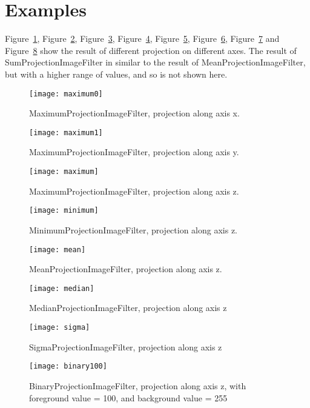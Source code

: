 \documentclass{InsightArticle}
\begin{document}
\section{Examples}
Figure~\ref{maximum0}, Figure~\ref{maximum1}, Figure~\ref{maximum},
Figure~\ref{minimum}, Figure~\ref{mean}, Figure~\ref{median},
Figure~\ref{sigma} and Figure~\ref{binary100} show the result
of different projection on different axes. The result of
SumProjectionImageFilter in similar to the result of MeanProjectionImageFilter,
but with a higher range of values, and so is not shown here.

\begin{figure}[htbp]
\centering
\texttt{[image: maximum0]}
\caption{MaximumProjectionImageFilter, projection along axis x.\label{maximum0}}
\end{figure}

\begin{figure}[htbp]
\centering
\texttt{[image: maximum1]}
\caption{MaximumProjectionImageFilter, projection along axis y.\label{maximum1}}
\end{figure}

\begin{figure}[htbp]
\centering
\texttt{[image: maximum]}
\caption{MaximumProjectionImageFilter, projection along axis z.\label{maximum}}
\end{figure}

\begin{figure}[htbp]
\centering
\texttt{[image: minimum]}
\caption{MinimumProjectionImageFilter, projection along axis z.\label{minimum}}
\end{figure}

\begin{figure}[htbp]
\centering
\texttt{[image: mean]}
\caption{MeanProjectionImageFilter, projection along axis z.\label{mean}}
\end{figure}

\begin{figure}[htbp]
\centering
\texttt{[image: median]}
\caption{MedianProjectionImageFilter, projection along axis z\label{median}}
\end{figure}

\begin{figure}[htbp]
\centering
\texttt{[image: sigma]}
\caption{SigmaProjectionImageFilter, projection along axis z\label{sigma}}
\end{figure}

\begin{figure}[htbp]
\centering
\texttt{[image: binary100]}
\caption{BinaryProjectionImageFilter, projection along axis z, with foreground value = 100, and background value = 255\label{binary100}}
\end{figure}
\end{document}
